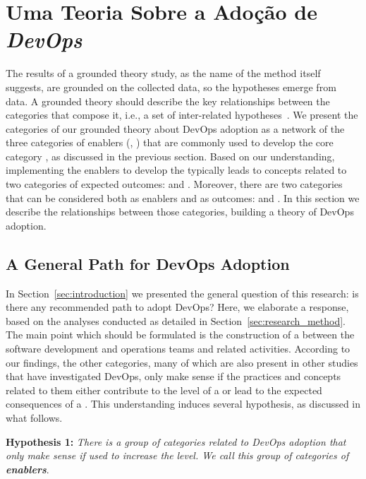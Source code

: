 \section{Uma Teoria Sobre a Adoção de \textit{DevOps}}\label{secao_teoria}

The results of a grounded theory study, as the name of the method itself
suggests, are grounded on the collected data, so the hypotheses emerge from
data. A grounded theory should describe the key relationships between the
categories that compose it, i.e., a set of inter-related hypotheses~\cite{hoda2017becoming}.
We present the categories of our grounded theory
about DevOps adoption as a network of the three categories of enablers (,
) that are commonly used to develop the core category
\cc, as discussed in the previous section. Based on our understanding,
implementing the enablers to develop the \cc typically leads
to concepts related to two categories of expected outcomes:
 and . Moreover, there are two categories that can be considered
both as enablers and as outcomes:  and .
In this section we describe the relationships between those categories, building a theory
of DevOps adoption.

\subsection{A General Path for DevOps Adoption}

In Section~\ref{sec:introduction} we presented the general question of this
research: is there any recommended path to adopt DevOps? Here, we elaborate a response,
based on the analyses conducted as detailed in Section~\ref{sec:research_method}. The main
point which should be formulated is the construction of a  between the software development and operations teams and
related activities. According to our findings, the other categories,
many of which are also present in other studies that have investigated DevOps,
only make sense if the practices and
concepts related to them either contribute to the level of a \cc or lead to the expected consequences
of a \cc. This understanding induces several hypothesis, as discussed in
what follows.

\begin{mh}
\textbf{Hypothesis 1:} \textit{There is a group of categories related to DevOps adoption
that only make sense if used to increase the} \cc \emph{level. We
call this group of categories of \textbf{enablers}}.
\end{mh}

